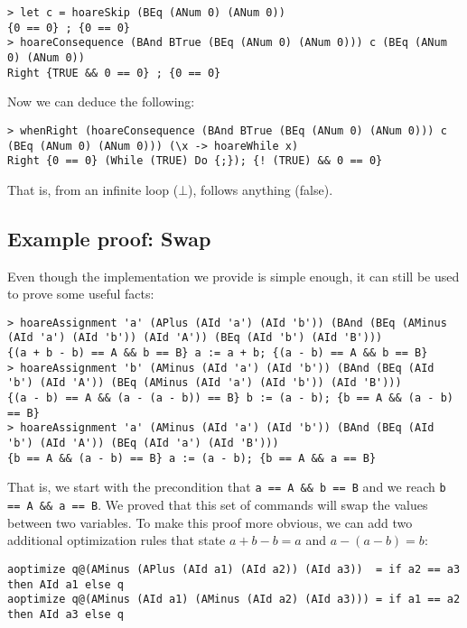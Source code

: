 \documentclass{article}
\begin{document}
\begin{lstlisting}
> let c = hoareSkip (BEq (ANum 0) (ANum 0))
{0 == 0} ; {0 == 0}
> hoareConsequence (BAnd BTrue (BEq (ANum 0) (ANum 0))) c (BEq (ANum 0) (ANum 0))
Right {TRUE && 0 == 0} ; {0 == 0}
\end{lstlisting}

Now we can deduce the following:

\begin{lstlisting}
> whenRight (hoareConsequence (BAnd BTrue (BEq (ANum 0) (ANum 0))) c (BEq (ANum 0) (ANum 0))) (\x -> hoareWhile x)
Right {0 == 0} (While (TRUE) Do {;}); {! (TRUE) && 0 == 0}
\end{lstlisting}

That is, from an infinite loop ($\bot$), follows anything (false).

\subsection{Example proof: Swap}

Even though the implementation we provide is simple enough, it can still be used to prove some useful facts:

\begin{lstlisting}
> hoareAssignment 'a' (APlus (AId 'a') (AId 'b')) (BAnd (BEq (AMinus (AId 'a') (AId 'b')) (AId 'A')) (BEq (AId 'b') (AId 'B')))
{(a + b - b) == A && b == B} a := a + b; {(a - b) == A && b == B}
> hoareAssignment 'b' (AMinus (AId 'a') (AId 'b')) (BAnd (BEq (AId 'b') (AId 'A')) (BEq (AMinus (AId 'a') (AId 'b')) (AId 'B')))
{(a - b) == A && (a - (a - b)) == B} b := (a - b); {b == A && (a - b) == B}
> hoareAssignment 'a' (AMinus (AId 'a') (AId 'b')) (BAnd (BEq (AId 'b') (AId 'A')) (BEq (AId 'a') (AId 'B')))
{b == A && (a - b) == B} a := (a - b); {b == A && a == B}
\end{lstlisting}

That is, we start with the precondition that \texttt{a == A \&\& b == B} and we reach \texttt{b == A \&\& a == B}. We proved that this set of commands will swap the values between two variables. To make this proof more obvious, we can add two additional optimization rules that state $a + b - b = a$ and $a - (a - b) = b$:

\begin{lstlisting}
aoptimize q@(AMinus (APlus (AId a1) (AId a2)) (AId a3))  = if a2 == a3 then AId a1 else q
aoptimize q@(AMinus (AId a1) (AMinus (AId a2) (AId a3))) = if a1 == a2 then AId a3 else q
\end{lstlisting}
\end{document}
